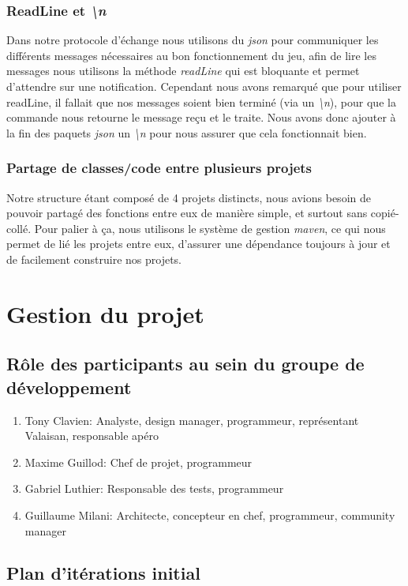 \documentclass[a4paper,12pt]{article}
\begin{document}
	\subsubsection{ReadLine et \textit{\textbackslash n}}
	Dans notre protocole d'échange nous utilisons du \textit{json} pour communiquer les différents messages nécessaires au bon fonctionnement du jeu, afin de lire les messages nous utilisons la méthode \textit{readLine} qui est bloquante et permet d'attendre sur une notification.
	Cependant nous avons remarqué que pour utiliser readLine, il fallait que nos messages soient bien terminé (via un \textit{\textbackslash n}), pour que la commande nous retourne le message reçu et le traite.
	Nous avons donc ajouter à la fin des paquets \textit{json} un \textit{\textbackslash n} pour nous assurer que cela fonctionnait bien.
	\subsubsection{Partage de classes/code entre plusieurs projets }
	Notre structure étant composé de 4 projets distincts, nous avions besoin de pouvoir partagé des fonctions entre eux de manière simple, et surtout sans copié-collé. 
	Pour palier à ça, nous utilisons le système de gestion \textit{maven}, ce qui nous permet de lié les projets entre eux, d'assurer une dépendance toujours à jour et de facilement construire nos projets.
	
	
	\section{Gestion du projet}
	
	
	\subsection{Rôle des participants au sein du groupe de développement}
	\begin{enumerate}
		\item Tony Clavien: Analyste, design manager, programmeur, représentant Valaisan, responsable apéro
		\item Maxime Guillod: Chef de projet, programmeur
		\item Gabriel Luthier: Responsable des tests, programmeur
		\item Guillaume Milani: Architecte, concepteur en chef, programmeur, community manager
	\end{enumerate}
	
	\subsection{Plan d'itérations initial}
	
\end{document}
